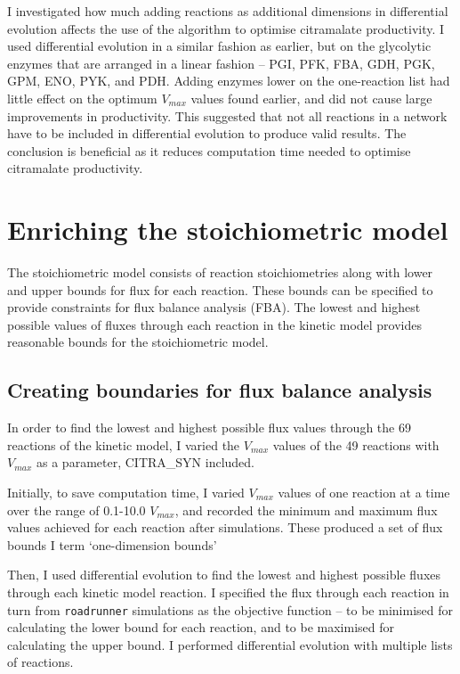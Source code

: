 \documentclass[parskip=full, numbers=noenddot]{scrreprt}
\begin{document}
I investigated how much adding reactions as additional dimensions in differential evolution affects the use of the algorithm to optimise citramalate productivity. I used differential evolution in a similar fashion as earlier, but on the glycolytic enzymes that are arranged in a linear fashion --  PGI, PFK, FBA, GDH, PGK, GPM, ENO, PYK, and PDH. Adding enzymes lower on the one-reaction list had little effect on the optimum $V_{max}$ values found earlier, and did not cause large improvements in productivity. This suggested that not all reactions in a network have to be included in differential evolution to produce valid results. The conclusion is beneficial as it reduces computation time needed to optimise citramalate productivity.

\chapter{Enriching the stoichiometric model}
\label{ch:stoich}

The stoichiometric model consists of reaction stoichiometries along with lower and upper bounds for flux for each reaction. These bounds can be specified to provide constraints for flux balance analysis (FBA).%
The lowest and highest possible values of fluxes through each reaction in the kinetic model provides reasonable bounds for the stoichiometric model.

\section{Creating boundaries for flux balance analysis}
\label{sec:bounds}

In order to find the lowest and highest possible flux values through the 69 reactions of the kinetic model, I varied the $V_{max}$ values of the 49 reactions with $V_{max}$ as a parameter, CITRA\_SYN included.

Initially, to save computation time, I varied $V_{max}$ values of one reaction at a time over the range of 0.1-10.0 $V_{max}$, and recorded the minimum and maximum flux values achieved for each reaction after simulations. These produced a set of flux bounds I term `one-dimension bounds'

Then, I used differential evolution to find the lowest and highest possible fluxes through each kinetic model reaction. I specified the flux through each reaction in turn from \texttt{roadrunner} simulations as the objective function -- to be minimised for calculating the lower bound for each reaction, and to be maximised for calculating the upper bound. I performed differential evolution with multiple lists of reactions.
\end{document}
